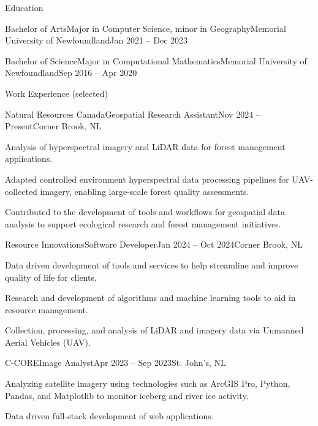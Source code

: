 \documentclass[]{Keenan-Nicholson-Resume}
\begin{document}
\resumeheader
{}
{}
{}
{}
{}

\begin{section}{Education}
    \begin{subsection}{Bachelor of Arts}{Major in Computer Science, minor in Geography}{Memorial University of Newfoundland}{Jan 2021 -- Dec 2023}
    \end{subsection}
    \begin{subsection}{Bachelor of Science}{Major in Computational Mathematics}{Memorial University of Newfoundland}{Sep 2016 -- Apr 2020}
    \end{subsection}
\end{section}

\begin{section}{Work Experience (selected)}
    \begin{subsection}{Natural Resources Canada}{Geospatial Research Assistant}{Nov 2024 -- Present}{Corner Brook, NL}
        \item Analysis of hyperspectral imagery and LiDAR data for forest management applications.
        \item Adapted controlled environment hyperspectral data processing pipelines for UAV-collected imagery, enabling large-scale forest quality assessments.
        \item Contributed to the development of tools and workflows for geospatial data analysis to support ecological research and forest management initiatives.
        
    \end{subsection}
    \begin{subsection}{Resource Innovations}{Software Developer}{Jan 2024 -- Oct 2024}{Corner Brook, NL}
        \item Data driven development of tools and services to help streamline and improve quality of life for clients.
        \item Research and development of algorithms and machine learning tools to aid in resource management.
        \item Collection, processing, and analysis of LiDAR and imagery data via Unmanned Aerial Vehicles (UAV).
    \end{subsection}
    \begin{subsection}{C-CORE}{Image Analyst}{Apr 2023 -- Sep 2023}{St. John's, NL}
        \item Analyzing satellite imagery using technologies such as ArcGIS Pro, Python, Pandas, and Matplotlib to \newline monitor iceberg and river ice activity.
        
        \item Data driven full-stack development of web applications.

    \end{subsection}
\end{section}
\end{document}
